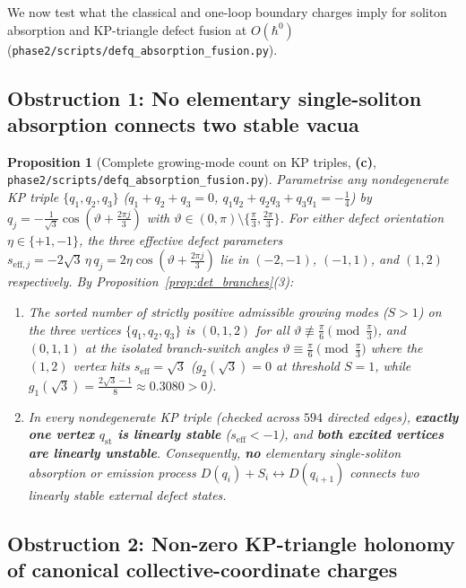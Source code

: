 \documentclass[11pt,a4paper]{article}
\newcommand{\Lc}{\textsf{\textbf{(c)}}}
\newcommand{\hb}{\hbar}
\newcommand{\sfus}{\texttt{phase2/\allowbreak scripts/\allowbreak defq\_\allowbreak absorption\_\allowbreak fusion.py}}
\newtheorem{proposition}{Proposition}[section]
\theoremstyle{remark}
\begin{document}
We now test what the classical and one-loop boundary charges imply for soliton
absorption and KP-triangle defect fusion at $O(\hb^0)$
(\sfus).

\subsection{Obstruction 1: No elementary single-soliton absorption connects two stable vacua}

\begin{proposition}[Complete growing-mode count on KP triples, \Lc, \sfus]\label{prop:stability_obstruction}
Parametrise any nondegenerate KP triple $\{q_1,q_2,q_3\}$ ($q_1+q_2+q_3=0$,
$q_1 q_2 + q_2 q_3 + q_3 q_1 = -\frac{1}{4}$) by
$q_j = -\frac{1}{\sqrt{3}}\cos(\vartheta + \frac{2\pi j}{3})$ with
$\vartheta \in (0,\pi)\setminus\{\frac{\pi}{3},\frac{2\pi}{3}\}$. For either
defect orientation $\eta \in \{+1,-1\}$, the three effective defect parameters
$s_{\mathrm{eff},j} = -2\sqrt{3}\,\eta\,q_j = 2\eta\cos(\vartheta+\frac{2\pi j}{3})$
lie in $(-2,-1)$, $(-1,1)$, and $(1,2)$ respectively. By Proposition~\ref{prop:det_branches}(3):
\begin{enumerate}
\item The sorted number of strictly positive admissible growing modes ($S>1$) on
the three vertices $\{q_1,q_2,q_3\}$ is $(0,1,2)$ for all
$\vartheta \not\equiv \frac{\pi}{6} \pmod{\frac{\pi}{3}}$, and $(0,1,1)$ at the
isolated branch-switch angles $\vartheta \equiv \frac{\pi}{6} \pmod{\frac{\pi}{3}}$
where the $(1,2)$ vertex hits $s_{\mathrm{eff}} = \sqrt{3}$ ($g_2(\sqrt{3})=0$ at
threshold $S=1$, while $g_1(\sqrt{3}) = \frac{2\sqrt{3}-1}{8} \approx 0.3080 > 0$).
\item In every nondegenerate KP triple (checked across $594$ directed edges),
\textbf{exactly one vertex $q_{\mathrm{st}}$ is linearly stable} ($s_{\mathrm{eff}} < -1$),
and \textbf{both excited vertices are linearly unstable}. Consequently, \textbf{no}
elementary single-soliton absorption or emission process
$D(q_i) + S_i \leftrightarrow D(q_{i+1})$ connects two linearly stable external
defect states.
\end{enumerate}
\end{proposition}

\subsection{Obstruction 2: Non-zero KP-triangle holonomy of canonical collective-coordinate charges}
\end{document}
